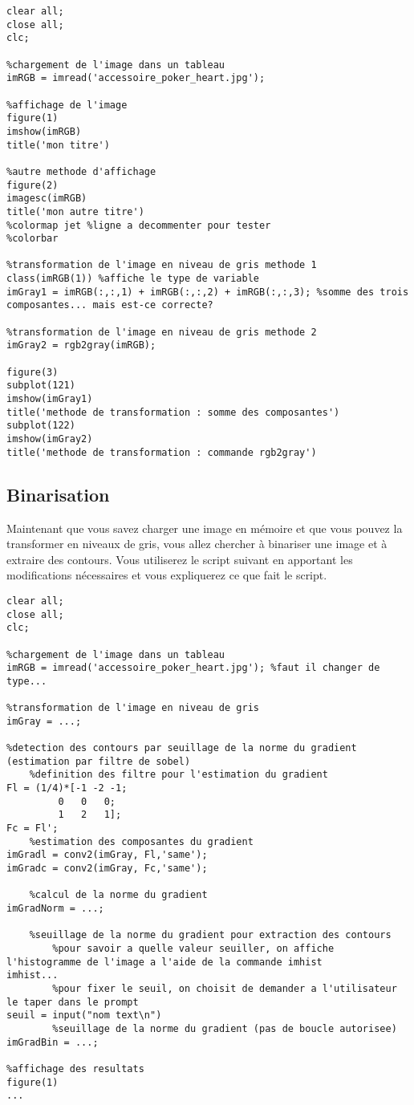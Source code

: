 \documentclass[10pt,a4paper]{article}
\begin{document}
\begin{verbatim}
clear all;
close all;
clc;

%chargement de l'image dans un tableau
imRGB = imread('accessoire_poker_heart.jpg');

%affichage de l'image
figure(1)
imshow(imRGB)
title('mon titre')

%autre methode d'affichage
figure(2)
imagesc(imRGB)
title('mon autre titre')
%colormap jet %ligne a decommenter pour tester
%colorbar

%transformation de l'image en niveau de gris methode 1
class(imRGB(1)) %affiche le type de variable
imGray1 = imRGB(:,:,1) + imRGB(:,:,2) + imRGB(:,:,3); %somme des trois composantes... mais est-ce correcte?

%transformation de l'image en niveau de gris methode 2
imGray2 = rgb2gray(imRGB);

figure(3)
subplot(121)
imshow(imGray1)
title('methode de transformation : somme des composantes')
subplot(122)
imshow(imGray2)
title('methode de transformation : commande rgb2gray')

\end{verbatim}




\subsection{Binarisation}

Maintenant que vous savez charger une image en m\'{e}moire et que vous pouvez la transformer en niveaux de gris, vous allez chercher \`{a} binariser une image et \`{a} extraire des contours. Vous utiliserez le script suivant en apportant les modifications n\'{e}cessaires et vous expliquerez ce que fait le script.

\begin{verbatim}
clear all;
close all;
clc;

%chargement de l'image dans un tableau
imRGB = imread('accessoire_poker_heart.jpg'); %faut il changer de type...

%transformation de l'image en niveau de gris
imGray = ...;

%detection des contours par seuillage de la norme du gradient (estimation par filtre de sobel)
    %definition des filtre pour l'estimation du gradient
Fl = (1/4)*[-1 -2 -1;
         0   0   0;
         1   2   1];
Fc = Fl';
    %estimation des composantes du gradient
imGradl = conv2(imGray, Fl,'same');
imGradc = conv2(imGray, Fc,'same');

    %calcul de la norme du gradient
imGradNorm = ...;

    %seuillage de la norme du gradient pour extraction des contours
        %pour savoir a quelle valeur seuiller, on affiche l'histogramme de l'image a l'aide de la commande imhist
imhist...
        %pour fixer le seuil, on choisit de demander a l'utilisateur le taper dans le prompt
seuil = input("nom text\n")
        %seuillage de la norme du gradient (pas de boucle autorisee)
imGradBin = ...;

%affichage des resultats
figure(1)
...


\end{verbatim}
\end{document}
